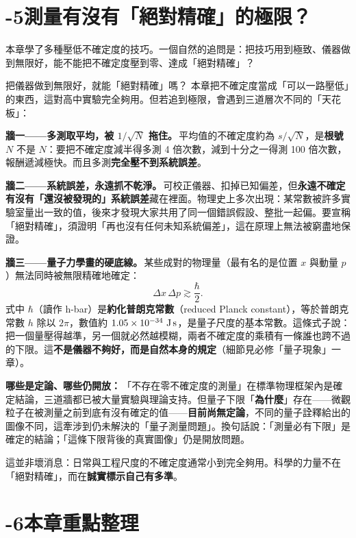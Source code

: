 \documentclass[11pt]{article}
\begin{document}
\section*{-5\quad 測量有沒有「絕對精確」的極限？}

本章學了多種壓低不確定度的技巧。一個自然的追問是：把技巧用到極致、儀器做到無限好，能不能把不確定度壓到零、達成「絕對精確」？

\begin{延伸框}{把儀器做到無限好，就能「絕對精確」嗎？}
本章把不確定度當成「可以一路壓低」的東西，這對高中實驗完全夠用。但若追到極限，會遇到三道層次不同的「天花板」：

\textbf{牆一——多測取平均，被 $1/\sqrt{N}$ 拖住。}\,平均值的不確定度約為 $s/\sqrt{N}$，是\textbf{根號 $N$} 不是 $N$：要把不確定度減半得多測 4 倍次數，減到十分之一得測 100 倍次數，報酬遞減極快。而且多測\textbf{完全壓不到系統誤差}。

\textbf{牆二——系統誤差，永遠抓不乾淨。}\,可校正儀器、扣掉已知偏差，但\textbf{永遠不確定有沒有「還沒被發現的」系統誤差}藏在裡面。物理史上多次出現：某常數被許多實驗室量出一致的值，後來才發現大家共用了同一個錯誤假設、整批一起偏。要宣稱「絕對精確」，須證明「再也沒有任何未知系統偏差」，這在原理上無法被窮盡地保證。

\textbf{牆三——量子力學畫的硬底線。}\,某些成對的物理量（最有名的是位置 $x$ 與動量 $p$）無法同時被無限精確地確定：
$$\Delta x\,\Delta p \gtrsim \frac{\hbar}{2}.$$
式中 $\hbar$（讀作 h-bar）是\textbf{約化普朗克常數}（reduced Planck constant），等於普朗克常數 $h$ 除以 $2\pi$，數值約 $1.05\times10^{-34}\ \text{J\,s}$，是量子尺度的基本常數。這條式子說：把一個量壓得越準，另一個就必然越模糊，兩者不確定度的乘積有一條誰也跨不過的下限。這\textbf{不是儀器不夠好，而是自然本身的規定}（細節見必修「量子現象」一章）。

\medskip
\textbf{哪些是定論、哪些仍開放：}\,「不存在零不確定度的測量」在標準物理框架內是確定結論，三道牆都已被大量實驗與理論支持。但量子下限「\textbf{為什麼}」存在——微觀粒子在被測量之前到底有沒有確定的值——\textbf{目前尚無定論}，不同的量子詮釋給出的圖像不同，這牽涉到仍未解決的「量子測量問題」。換句話說：「測量必有下限」是確定的結論；「這條下限背後的真實圖像」仍是開放問題。

這並非壞消息：日常與工程尺度的不確定度通常小到完全夠用。科學的力量不在「絕對精確」，而在\textbf{誠實標示自己有多準}。
\end{延伸框}

\section*{-6\quad 本章重點整理}
\end{document}
